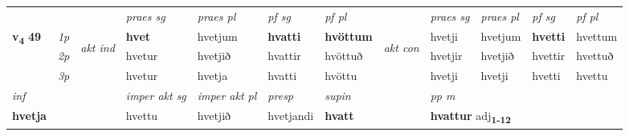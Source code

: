 \begin{longtable}[l]{X>{\footnotesize\itshape}llXXXXlXXXX}
 & &   & \textit{praes sg}  & \textit{praes pl}    & \textit{ pf sg} & \textit{pf pl} & & \textit{praes sg}  & \textit{praes pl}    & \textit{pf sg} & \textit{pf pl }  \\ \cmidrule{4-7} \cmidrule{9-12}
 \multirow{2}{*}{{{\textbf{v{\textsubscript{4}}} \Large{\textbf{49}}}}}  & 1p & \multirow{3}{*}{\begin{turn}{90}\textit{akt ind}\end{turn}} & \textbf{hvet} & hvetjum & \textbf{hvatti} & \textbf{hvöttum} & \multirow{3}{*}{\begin{turn}{90}\textit{akt con}\end{turn}} &hvetji & hvetjum & \textbf{hvetti} & hvettum\\*
 & 2p &  &  hvetur  & hvetjið & hvattir & hvöttuð & & hvetjir & hvetjið & hvettir & hvettuð \\*
 & 3p &  & hvetur & hvetja & hvatti & hvöttu & & hvetji & hvetji& hvetti & hvettu \\*
\cmidrule{4-7} \cmidrule{9-12}

   {\textit{inf}} & &  & \textit{imper akt sg} & \textit{imper akt pl}   & \textit{presp} & \textit{supin}  && \textit{pp m} \\*
  {\textbf{hvetja}} & && hvettu  & hvetjið   & hvetjandi &  \textbf{hvatt}  && \multicolumn{2}{l}{\textbf{hvattur} adj\textbf{\textsubscript{1-12}}} \\*

\midrule


\end{longtable}
